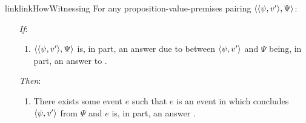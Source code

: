 \begin{note}
  \begin{restatable}{link}{linkHowWitnessing}
    \label{link:how-witnessing}
    For any proposition-value-premises pairing \(\langle \langle \psi, v' \rangle, \Psi \rangle\):
    \begin{itemize}
    \item[\emph{If}:]
      \begin{enumerate}[label=\alph*., ref=(\alph*)]
      \item
        \(\langle \langle \psi, v' \rangle, \Psi \rangle\) is, in part, an answer \qHow{} due to \ros{} between \(\langle \psi, v' \rangle\) and \(\Psi\) being, in part, an answer to \qWhyV{}.
      \end{enumerate}
    \item[\emph{Then}:]
      \begin{enumerate}[label=\alph*., ref=(\alph*), resume]
      \item
        There exists some event \(e\) such that \(e\) is an event in which \vAgent{} concludes \(\langle \psi, v' \rangle\) from \(\Psi\) and \(e\) is, in part, an answer \qHowV{}.
      \end{enumerate}
    \end{itemize}
    \vspace{-\baselineskip}
  \end{restatable}

\end{note}


